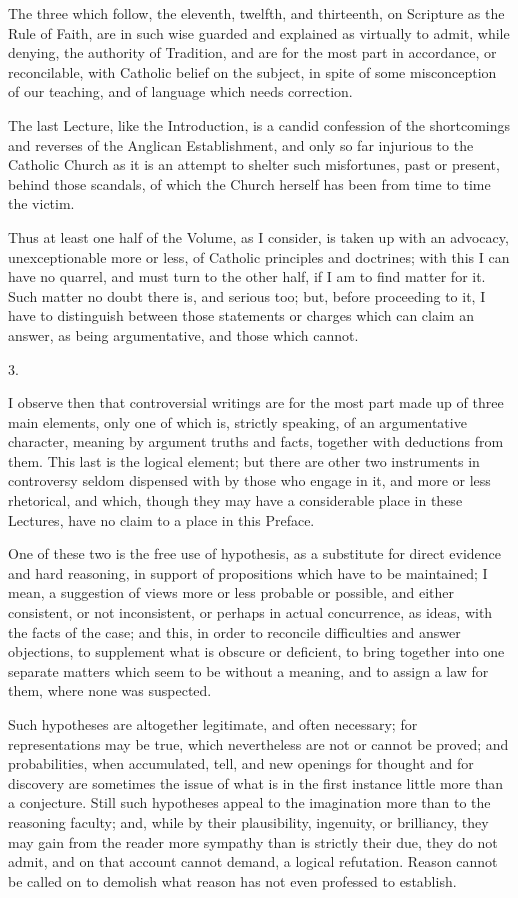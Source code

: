 The three which follow, the eleventh, twelfth, and thirteenth, on
Scripture as the Rule of Faith, are in such wise guarded and explained
as virtually to admit, while denying, the authority of Tradition, and
are for the most part in accordance, or reconcilable, with Catholic
belief on the subject, in spite of some misconception of our teaching,
and of language which needs correction.

The last Lecture, like the Introduction, is a candid confession of
the shortcomings and reverses of the Anglican Establishment, and only
so far injurious to the Catholic Church as it is an attempt to shelter
such misfortunes, past or present, behind those scandals, of which the
Church herself has been from time to time the victim.

Thus at least one half of the Volume, as I consider, is taken up
with an advocacy, unexceptionable more or less, of Catholic principles
and doctrines; with this I can have no quarrel, and must turn to the
other half, if I am to find matter for it. Such matter no doubt there
is, and serious too; but, before proceeding to it, I have to
distinguish between those statements or charges which can claim an
answer, as being argumentative, and those which cannot.

3.

I observe then that controversial writings are for the most part
made up of three main elements, only one of which is, strictly
speaking, of an argumentative character, meaning by argument truths
and facts, together with deductions from them. This last is the
logical element; but there are other two instruments in controversy
seldom dispensed with by those who engage in it, and more or less
rhetorical, and which, though they may have a considerable place in
these Lectures, have no claim to a place in this Preface.

One of these two is the free use of hypothesis, as a substitute for
direct evidence and hard reasoning, in support of propositions which
have to be maintained; I mean, a suggestion of views more or less
probable or possible, and either consistent, or not inconsistent, or
perhaps in actual concurrence, as ideas, with the facts of the case;
and this, in order to reconcile difficulties and answer objections, to
supplement what is obscure or deficient, to bring together into one
separate matters which seem to be without a meaning, and to assign a
law for them, where none was suspected.

Such hypotheses are altogether legitimate, and often necessary; for
representations may be true, which nevertheless are not or cannot be
proved; and probabilities, when accumulated, tell, and new openings
for thought and for discovery are sometimes the issue of what is in
the first instance little more than a conjecture. Still such
hypotheses appeal to the imagination more than to the reasoning
faculty; and, while by their plausibility, ingenuity, or brilliancy,
they may gain from the reader more sympathy than is strictly their
due, they do not admit, and on that account cannot demand, a logical
refutation. Reason cannot be called on to demolish what reason has not
even professed to establish.

